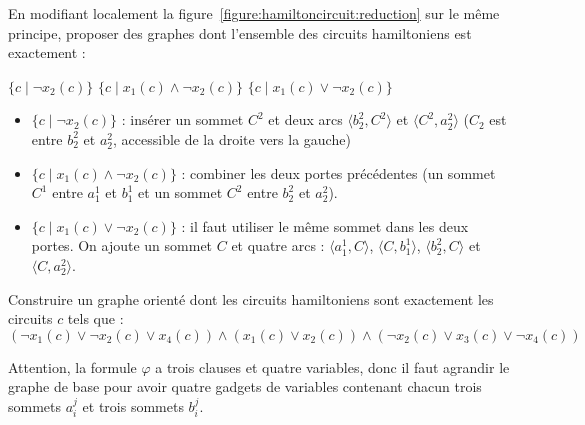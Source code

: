 \begin{exercice}[\textsc{Circuit Hamiltonien} est NP-complet%
    \footnote{Vidéo détaillée de la réduction de \textsc{3-SAT} à \textsc{Cycle Hamiltonien} : \url{https://www.youtube.com/watch?v=OHnX-R_SBpM}}]
  \ifcorrection{\newpage}
  \begin{questions}
  \item En modifiant localement la figure~\ref{figure:hamiltoncircuit:reduction} sur le même principe,
    proposer des graphes dont l'ensemble des circuits hamiltoniens est exactement :
    \begin{center}
      $\{c \mid \lnot x_2(c)\}$ \quad\quad $\{c \mid x_1(c) \land \lnot x_2(c)\}$  \quad\quad $\{c \mid x_1(c) \lor \lnot x_2(c)\}$ 
    \end{center}
  \end{questions}
  \begin{corrections}
    \begin{itemize}
    \item $\{ c \mid \lnot x_2(c) \}$ : insérer un sommet $C^2$ et deux arcs $\langle b_2^2, C^2\rangle$ et $\langle C^2, a_2^2 \rangle$
      ($C_2$ est entre $b_2^2$ et $a_2^2$, accessible de la droite vers la gauche)
    \item $\{ c \mid x_1(c) \land \lnot x_2(c) \}$ : combiner les deux portes précédentes
      (un sommet $C^1$ entre $a_1^1$ et $b_1^1$ et un sommet $C^2$ entre $b_2^2$ et $a_2^2$). 
    \item $\{ c \mid x_1(c) \lor \lnot x_2(c) \}$ : il faut utiliser le même sommet dans les deux portes.
      On ajoute un sommet $C$ et quatre arcs : $\langle a_1^1, C\rangle$, $\langle C, b_1^1 \rangle$, $\langle b_2^2, C\rangle$ et $\langle C, a_2^2 \rangle$.
    \end{itemize}
  \end{corrections}
  
  \begin{questions}
  \item Construire un graphe orienté dont les circuits hamiltoniens sont exactement les circuits $c$ tels que :
    $$(\lnot x_1(c) \lor \lnot x_2(c) \lor x_4(c)) \land (x_1(c) \lor x_2(c)) \land (\lnot x_2(c) \lor x_3(c) \lor \lnot x_4(c))$$
  \end{questions}
  \begin{corrections}
    Attention, la formule $\varphi$ a trois clauses et quatre variables, donc il faut agrandir le graphe de base pour avoir
    quatre gadgets de variables contenant chacun trois sommets $a_i^j$ et trois sommets $b_i^j$. 

    \vspace{-2mm}
    \begin{center}
\end{center}
\end{corrections}
\end{exercice}
